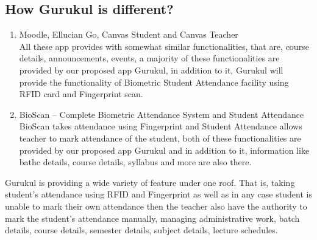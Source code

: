 \subsection{How Gurukul is different?}
   \begin{enumerate}
       \item Moodle, Ellucian Go, Canvas Student and Canvas Teacher
       \\All these app provides with somewhat similar functionalities, that are, course details, announcements, events, a majority of these functionalities are provided by our proposed app Gurukul, in addition to it, Gurukul will provide the functionality of Biometric Student Attendance facility using RFID card and Fingerprint scan.
       
       \item BioScan  – Complete Biometric Attendance System and Student Attendance
       \\BioScan takes attendance using Fingerprint and Student Attendance allows teacher to mark attendance of the student, both of these functionalities are provided by our proposed app Gurukul and in addition to it, information like bathc details, course details, syllabus and more are also there.
   \end{enumerate}
   
   \vspace{5mm}
\hspace{4mm}Gurukul is providing a wide variety of feature under one roof. That is, taking student's attendance using RFID and Fingerprint as well as in any case student is unable to mark their own attendance then the teacher also have the authority to mark the student's attendance manually, managing administrative work, batch details, course details, semester details, subject details, lecture schedules.